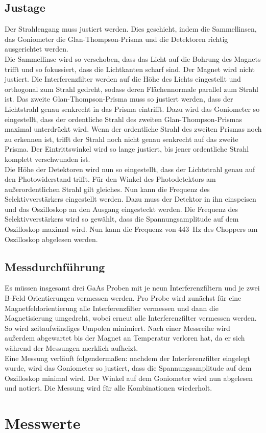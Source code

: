 \subsection{Justage}
\noindent Der Strahlengang muss justiert werden. Dies geschieht, indem die Sammellinsen, das Goniometer die Glan-Thompson-Prisma und 
die Detektoren richtig ausgerichtet werden. \\
Die Sammellinse wird so verschoben, dass das Licht auf die Bohrung des Magnets trifft und so fokussiert, dass die Lichtkanten scharf sind. 
Der Magnet wird nicht justiert.
Die Interferenzfilter werden auf die Höhe des Lichts eingestellt und orthogonal zum Strahl gedreht, sodass deren Flächennormale parallel zum 
Strahl ist. Das zweite Glan-Thompson-Prisma muss so justiert werden, dass der Lichtstrahl genau senkrecht in das Prisma eintrifft. Dazu wird 
das Goniometer so eingestellt, dass der ordentliche Strahl des zweiten Glan-Thompson-Prismas maximal unterdrückt wird. Wenn der ordentliche 
Strahl des zweiten Prismas noch zu erkennen ist, trifft der Strahl noch nicht genau senkrecht auf das zweite Prisma. Der Eintrittswinkel wird 
so lange justiert, bis jener ordentliche Strahl komplett verschwunden ist. \\
Die Höhe der Detektoren wird nun so eingestellt, dass der Lichtstrahl genau auf den Photowiderstand trifft. Für den Winkel des Photodetektors 
am außerordentlichen Strahl gilt gleiches.
Nun kann die Frequenz des Selektivverstärkers eingestellt werden. Dazu muss der Detektor in ihn einspeisen und das Oszilloskop an den Ausgang 
eingesteckt werden. Die Frequenz des Selektivverstärkers wird so gewählt, dass die Spannungsamplitude auf dem Oszilloskop maximal wird.
Nun kann die Frequenz von \qty{443}{\hertz} des Choppers am Oszilloskop abgelesen werden.


\subsection{Messdurchführung}
\noindent Es müssen insgesamt drei GaAs Proben mit je neun Interferenzfiltern und je zwei B-Feld Orientierungen vermessen werden.
Pro Probe wird zunächst für eine Magnetfeldorientierung alle Interferenzfilter vermessen und dann die Magnetisierung umgedreht, wobei erneut alle 
Interferenzfilter vermessen werden. So wird zeitaufwändiges Umpolen minimiert. Nach einer Messreihe wird außerdem abgewartet bis der Magnet an 
Temperatur verloren hat, da er sich während der Messungen merklich aufheizt.\\
Eine Messung verläuft folgendermaßen: nachdem der Interferenzfilter eingelegt wurde, wird das Goniometer so justiert, dass die Spannungsamplitude 
auf dem Oszilloskop minimal wird. Der Winkel auf dem Goniometer wird nun abgelesen und notiert. Die Messung wird für alle Kombinationen wiederholt. 



\section{Messwerte}


